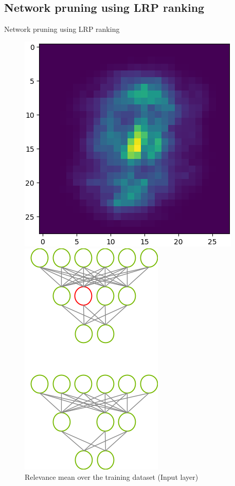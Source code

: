\documentclass[aspectratio=169]{beamer}
\theoremstyle{definition}
\begin{document}
\subsection{Network pruning using LRP ranking}
\begin{frame}{Network pruning using LRP ranking}
    \begin{figure}[ht]
        \begin{minipage}[c]{0.55\linewidth}
            \centering
            \includegraphics[width=.6\textwidth]{relevance-mean.png}
            \caption{Relevance mean over the training dataset (Input layer)}
        \end{minipage}
        \hspace{0.5cm}
        \begin{minipage}[c]{0.35\linewidth}
            \centering
            \includegraphics[width=.7\textwidth]{pruning.png}
        \end{minipage}
    \end{figure}
\end{frame}
\end{document}
